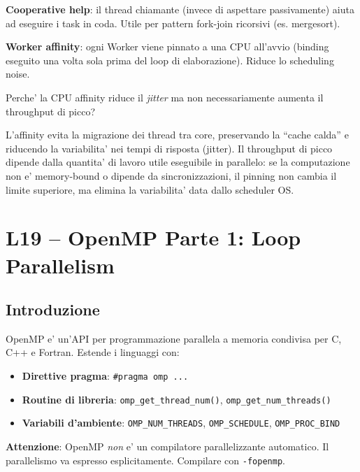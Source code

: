 \documentclass[11pt,a4paper]{article}
\theoremstyle{remark}
\newenvironment{esercizio}[1][]{%
  \begin{tcolorbox}[breakable,title={\textbf{Esercizio / Domanda d'esame}\ifx&#1&\else: #1\fi},
    colback=yellow!5!white, colframe=orange!75!black, fonttitle=\small\bfseries]%
}{%
  \end{tcolorbox}%
}
\newenvironment{risposta}{%
  \begin{tcolorbox}[breakable,title={\textbf{Risposta}},
    colback=green!5!white, colframe=green!50!black, fonttitle=\small\bfseries]%
}{%
  \end{tcolorbox}%
}
\begin{document}
\textbf{Cooperative help}: il thread chiamante (invece di aspettare passivamente) aiuta ad eseguire i task in coda. Utile per pattern fork-join ricorsivi (es. mergesort).

\textbf{Worker affinity}: ogni Worker viene pinnato a una CPU all'avvio (binding eseguito una volta sola prima del loop di elaborazione). Riduce lo scheduling noise.

\begin{esercizio}
Perche' la CPU affinity riduce il \emph{jitter} ma non necessariamente aumenta il throughput di picco?
\end{esercizio}
\begin{risposta}
L'affinity evita la migrazione dei thread tra core, preservando la ``cache calda'' e riducendo la variabilita' nei tempi di risposta (jitter). Il throughput di picco dipende dalla quantita' di lavoro utile eseguibile in parallelo: se la computazione non e' memory-bound o dipende da sincronizzazioni, il pinning non cambia il limite superiore, ma elimina la variabilita' data dallo scheduler OS.
\end{risposta}

\section{L19 -- OpenMP Parte 1: Loop Parallelism}

\subsection{Introduzione}

OpenMP e' un'API per programmazione parallela a memoria condivisa per C, C++ e Fortran. Estende i linguaggi con:
\begin{itemize}
  \item \textbf{Direttive pragma}: \lstinline|#pragma omp ...|
  \item \textbf{Routine di libreria}: \lstinline|omp_get_thread_num()|, \lstinline|omp_get_num_threads()|
  \item \textbf{Variabili d'ambiente}: \texttt{OMP\_NUM\_THREADS}, \texttt{OMP\_SCHEDULE}, \texttt{OMP\_PROC\_BIND}
\end{itemize}

\textbf{Attenzione}: OpenMP \emph{non} e' un compilatore parallelizzante automatico. Il parallelismo va espresso esplicitamente. Compilare con \texttt{-fopenmp}.
\end{document}
